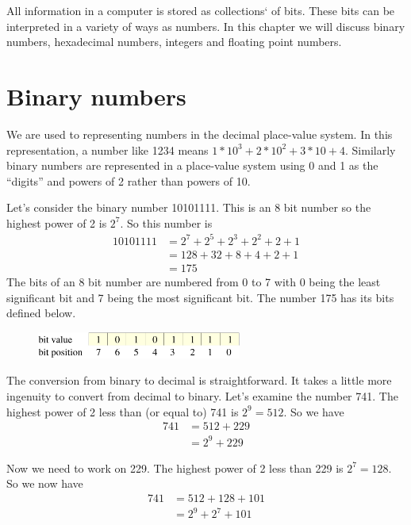 \documentclass[11pt,b5paper]{book}
\begin{document}
All information in a computer is stored as collections` of bits.
These bits can be interpreted in a variety of ways as numbers.
In this chapter we will discuss binary numbers, hexadecimal numbers, integers
and floating point numbers.

\section{Binary numbers}

We are used to representing numbers in the decimal place-value system. 
In this representation, a number like 1234 means $1*10^3 + 2*10^2 + 3*10 + 4$. 
Similarly binary numbers are represented in a place-value system using 0 and 1
as the ``digits'' and powers of 2 rather than powers of 10.

Let's consider the binary number 10101111.
This is an 8 bit number so the highest power of 2 is $2^7$.
So this number is
\begin{align*}
10101111 &= 2^7 + 2^5 + 2^3 + 2^2 + 2 + 1 \\
         &= 128 + 32 + 8 + 4 + 2 + 1 \\
         &= 175
\end{align*}
The bits of an 8 bit number are numbered from 0 to 7 with 0 being the least 
significant bit and 7 being the most significant bit.  
The number 175 has its bits defined below.

\begin{figure}[h!]
\centering\includegraphics[width=0.6\textwidth]{175.pdf}
\end{figure}

The conversion from binary to decimal is straightforward. 
It takes a little more ingenuity to convert from decimal to binary.
Let's examine the number 741.
The highest power of 2 less than (or equal to) 741 is $2^9 = 512$.
So we have 
\begin{align*}
 741 &= 512 + 229\\
     &= 2^9 + 229
\end{align*}

Now we need to work on 229.
The highest power of 2 less than 229 is $2^7 = 128$.
So we now have
\begin{align*}
741 &= 512 + 128 + 101 \\
    &= 2^9 + 2^7 + 101
\end{align*}
\end{document}
